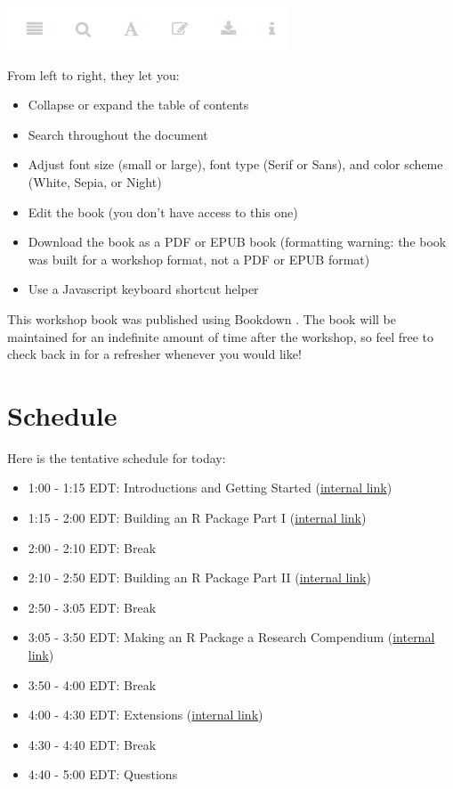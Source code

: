 \documentclass[
]{book}
\providecommand{\tightlist}{%
  \setlength{\itemsep}{0pt}\setlength{\parskip}{0pt}}
\begin{document}
\includegraphics[width=1\linewidth]{images/newrpack_files0}

From left to right, they let you:

\begin{itemize}
\tightlist
\item
  Collapse or expand the table of contents
\item
  Search throughout the document
\item
  Adjust font size (small or large), font type (Serif or Sans), and color scheme (White, Sepia, or Night)
\item
  Edit the book (you don't have access to this one)
\item
  Download the book as a PDF or EPUB book (formatting warning: the book was built for a workshop format, not a PDF or EPUB format)
\item
  Use a Javascript keyboard shortcut helper
\end{itemize}

This workshop book was published using Bookdown \citep{xie2016bookdown}. The book will be maintained for an indefinite amount of time after the workshop, so feel free to check back in for a refresher whenever you would like!

\hypertarget{schedule}{%
\section*{Schedule}\label{schedule}}

Here is the tentative schedule for today:

\begin{itemize}
\tightlist
\item
  1:00 - 1:15 EDT: Introductions and Getting Started (\protect\hyperlink{getting-started}{internal link})
\item
  1:15 - 2:00 EDT: Building an R Package Part I (\protect\hyperlink{r-package}{internal link})
\item
  2:00 - 2:10 EDT: Break
\item
  2:10 - 2:50 EDT: Building an R Package Part II (\protect\hyperlink{r-package}{internal link})
\item
  2:50 - 3:05 EDT: Break
\item
  3:05 - 3:50 EDT: Making an R Package a Research Compendium (\protect\hyperlink{r-package-rc}{internal link})
\item
  3:50 - 4:00 EDT: Break
\item
  4:00 - 4:30 EDT: Extensions (\protect\hyperlink{extensions}{internal link})
\item
  4:30 - 4:40 EDT: Break
\item
  4:40 - 5:00 EDT: Questions
\end{itemize}
\end{document}
